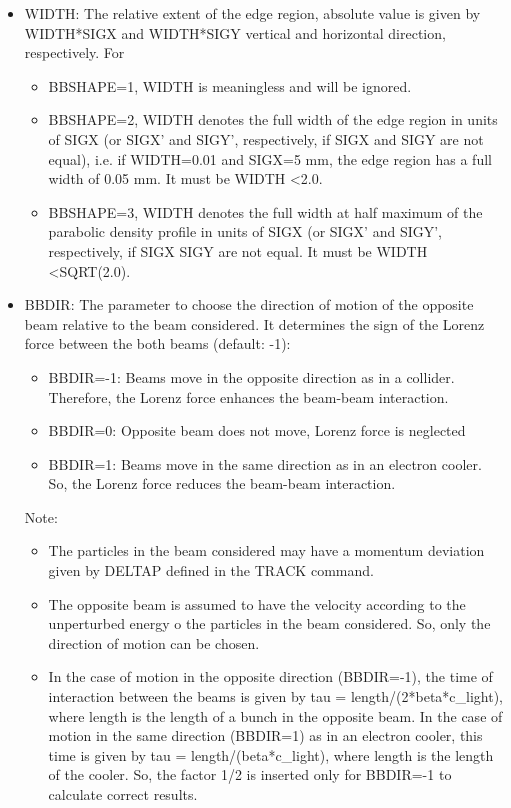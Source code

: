 \begin{itemize}
   \item  WIDTH: The relative extent of the edge region, absolute value is given by 
     WIDTH*SIGX and WIDTH*SIGY vertical and horizontal direction, respectively. 
     For 
     \begin{itemize}
        \item  BBSHAPE=1, WIDTH is meaningless and will be ignored.
	\item  BBSHAPE=2, WIDTH denotes the full width of the edge region in units of 
          SIGX (or SIGX' and SIGY', respectively, if SIGX and SIGY are not equal), i.e. 
          if WIDTH=0.01 and SIGX=5 mm, the edge  region has a full width of 0.05
          mm. It must be WIDTH \textless   2.0.
	\item  BBSHAPE=3, WIDTH denotes the full width at half maximum of the parabolic 
          density profile in units of SIGX (or SIGX' and SIGY', respectively, if SIGX 
          SIGY are not equal. It must be WIDTH \textless   SQRT(2.0).
     \end{itemize} 
   \item  BBDIR: The parameter to choose the direction of motion of the 
     opposite beam relative to the beam considered. It determines 
     the sign of the Lorenz force between the both beams (default: -1): 
     \begin{itemize}
        \item  BBDIR=-1: Beams move in the opposite direction as in a collider. 
          Therefore, the Lorenz force enhances the beam-beam interaction. 
	\item  BBDIR=0: Opposite beam does not move, Lorenz force is neglected 
	\item  BBDIR=1: Beams move in the same direction as in an electron cooler. 
          So, the Lorenz force reduces the beam-beam interaction. 
     \end{itemize}
     Note:  
     \begin{itemize}  
        \item  The particles in the beam considered may have a momentum deviation 
          given by DELTAP defined in the TRACK command. 
	\item  The opposite beam is assumed to have the velocity according to the 
          unperturbed energy o the particles in the beam considered. 
          So, only the direction of motion can be chosen. 
	\item  In the case of motion in the opposite direction (BBDIR=-1), 
          the time of interaction between the beams is given by 
          tau = length/(2*beta*c\_light), where length is the length of a bunch in the 
          opposite beam. In the case of motion in the same direction 
          (BBDIR=1) as in an electron cooler, this time 
          is given by tau = length/(beta*c\_light), where length is the length of 
          the cooler. So, the factor 1/2 is inserted only for BBDIR=-1 to calculate 
          correct results. 
     \end{itemize} 
\end{itemize}


